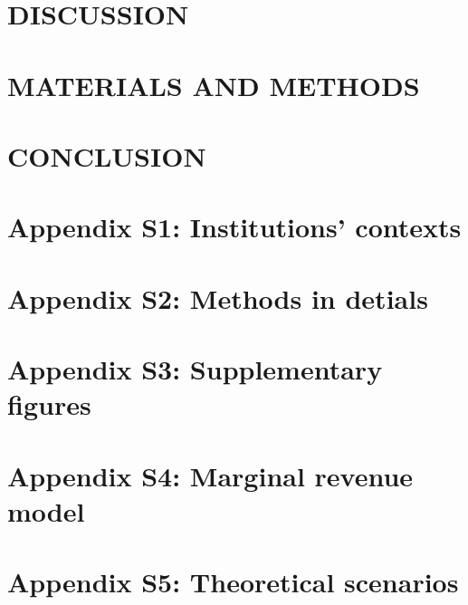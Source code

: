 \documentclass{../nsr}
\begin{document}
\section{DISCUSSION}\label{sec:discussion}


\section{MATERIALS AND METHODS}\label{sec:methods}



\section{CONCLUSION}\label{sec:conclu sion}



\appendix
\label{appendix}

\section{Appendix S1: Institutions' contexts}


\section{Appendix S2: Methods in detials}

\section{Appendix S3: Supplementary figures}

\section{Appendix S4: Marginal revenue model}

\section{Appendix S5: Theoretical scenarios}


\label{bib}
\end{document}
